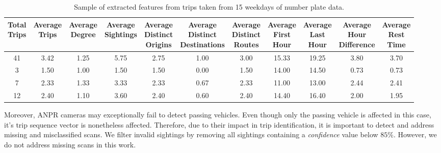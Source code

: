 \begin{table*}[t]
\centering
\begin{tabular}{c c c c c c c c c c c}
  \hline
 \thead{Total\\Trips} & \thead{Average\\Trips} & \thead{Average\\Degree} & \thead{Average\\Sightings} & \thead{Average\\Distinct\\Origins} & \thead{Average\\Distinct\\Destinations} & \thead{Average\\Distinct\\Routes} & \thead{Average\\First\\Hour} & \thead{Average\\Last\\Hour} & \thead{Average\\Hour\\Difference} & \thead{Average\\Rest\\Time} \\
  \hline
41 & 3.42 & 1.25 & 5.75 & 2.75 & 1.00 & 3.00 & 15.33 & 19.25 & 3.80 & 3.70 \\
3 & 1.50 & 1.00 & 1.50 & 1.50 & 0.00 & 1.50 & 14.00 & 14.50 & 0.73 & 0.73 \\
7 & 2.33 & 1.33 & 3.33 & 2.33 & 0.67 & 2.33 & 11.00 & 13.00 & 2.44 & 2.41 \\
12 & 2.40 & 1.10 & 3.60 & 2.40 & 0.60 & 2.40 & 14.40 & 16.40 & 2.00 & 1.95 \\
   \hline
\end{tabular}
\caption{Sample of extracted features from trips taken from 15 weekdays of number plate data.}
\vspace{-0.2cm}
\label{t:features}
\end{table*}

Moreover, ANPR cameras may exceptionally fail to detect passing vehicles. Even though only the passing vehicle is affected in this case, it's trip sequence vector is nonetheless affected. Therefore, due to their impact in trip identification, it is important to detect and address missing and misclassified scans. We filter invalid sightings by removing all sightings containing a \emph{confidence} value below $85\%$. However, we do not address missing scans in this work.
